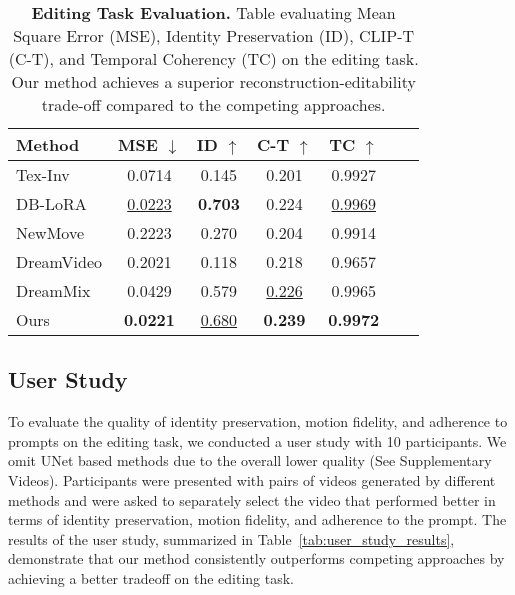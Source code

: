 \begin{table}[h]
\centering
\caption{\textbf{Editing Task Evaluation.} Table evaluating Mean Square Error (MSE), Identity Preservation (ID), CLIP-T (C-T), and Temporal Coherency (TC) on the editing task. Our method achieves a superior reconstruction-editability trade-off compared to the competing approaches.}
\label{tab:compare}
\begin{tabular}{lcccccc}
\toprule
\textbf{Method} & \textbf{MSE $\downarrow$} & \textbf{ID $\uparrow$} & \textbf{C-T $\uparrow$}  & \textbf{TC $\uparrow$}\\
\midrule
Tex-Inv & 0.0714  & 0.145 & 0.201  & 0.9927 \\
DB-LoRA  & \underline{0.0223}  & \textbf{0.703} & 0.224   & \underline{0.9969} \\
NewMove & 0.2223 & 0.270 & 0.204		& 0.9914 \\
DreamVideo       &0.2021  & 0.118 & 0.218	 	 & 0.9657 \\
DreamMix         & 0.0429  & 0.579  & \underline{0.226}  & 0.9965 \\
Ours              & \textbf{0.0221}   &  \underline{0.680} & \textbf{0.239}  & \textbf{0.9972}  \\
\bottomrule
\end{tabular}
\end{table}


\subsection{User Study}

To evaluate the quality of identity preservation, motion fidelity, and adherence to prompts on the editing task, we conducted a user study with 10 participants. We omit UNet based methods due to the overall lower quality (See Supplementary Videos). Participants were presented with pairs of videos generated by different methods and were asked to separately select the video that performed better in terms of identity preservation, motion fidelity, and adherence to the prompt. The results of the user study, summarized in Table~\ref{tab:user_study_results}, demonstrate that our method consistently outperforms competing approaches by achieving a better tradeoff on the editing task.

